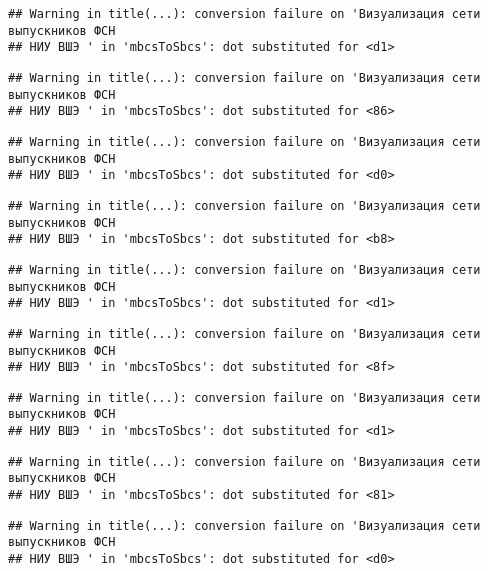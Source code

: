 \documentclass[
]{article}
\begin{document}
\begin{verbatim}
## Warning in title(...): conversion failure on 'Визуализация сети выпускников ФСН
## НИУ ВШЭ ' in 'mbcsToSbcs': dot substituted for <d1>
\end{verbatim}

\begin{verbatim}
## Warning in title(...): conversion failure on 'Визуализация сети выпускников ФСН
## НИУ ВШЭ ' in 'mbcsToSbcs': dot substituted for <86>
\end{verbatim}

\begin{verbatim}
## Warning in title(...): conversion failure on 'Визуализация сети выпускников ФСН
## НИУ ВШЭ ' in 'mbcsToSbcs': dot substituted for <d0>
\end{verbatim}

\begin{verbatim}
## Warning in title(...): conversion failure on 'Визуализация сети выпускников ФСН
## НИУ ВШЭ ' in 'mbcsToSbcs': dot substituted for <b8>
\end{verbatim}

\begin{verbatim}
## Warning in title(...): conversion failure on 'Визуализация сети выпускников ФСН
## НИУ ВШЭ ' in 'mbcsToSbcs': dot substituted for <d1>
\end{verbatim}

\begin{verbatim}
## Warning in title(...): conversion failure on 'Визуализация сети выпускников ФСН
## НИУ ВШЭ ' in 'mbcsToSbcs': dot substituted for <8f>
\end{verbatim}

\begin{verbatim}
## Warning in title(...): conversion failure on 'Визуализация сети выпускников ФСН
## НИУ ВШЭ ' in 'mbcsToSbcs': dot substituted for <d1>
\end{verbatim}

\begin{verbatim}
## Warning in title(...): conversion failure on 'Визуализация сети выпускников ФСН
## НИУ ВШЭ ' in 'mbcsToSbcs': dot substituted for <81>
\end{verbatim}

\begin{verbatim}
## Warning in title(...): conversion failure on 'Визуализация сети выпускников ФСН
## НИУ ВШЭ ' in 'mbcsToSbcs': dot substituted for <d0>
\end{verbatim}
\end{document}
